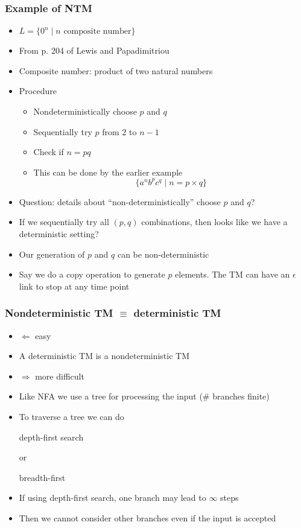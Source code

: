 \begin{frame}[allowframebreaks]
\begin{itemize}
\end{itemize}\end{frame} \begin{frame}[allowframebreaks] \frametitle{Example of NTM}
  \begin{itemize}
\item $L=\{0^n\mid n \mbox{ composite number}\}$
\item From p. 204 of Lewis and Papadimitriou
\item Composite number: product of two natural numbers
\item Procedure
  \begin{itemize}
  \item Nondeterministically choose $p$ and $q$

  \item [] Sequentially try $p$ from $2$ to $n-1$

  \item Check if $n=pq$

  \item [] This can be done by the earlier example
    \begin{equation*}
    \{a^n b^p c^q\mid n = p \times q\}
  \end{equation*}
  \end{itemize}
\item Question: details about ``non-deterministically'' choose $p$ and $q$?
\item If we sequentially try all $(p,q)$ combinations, then
  looks like we have a deterministic setting?
  
\item Our generation of  $p$ and $q$ can be non-deterministic
\item Say we do a copy operation to generate $p$ elements. The TM can
  have an $\epsilon$ link to stop at any time point
\end{itemize}\end{frame} \begin{frame}[allowframebreaks] \frametitle{Nondeterministic TM $
\equiv$ deterministic TM}
  \begin{itemize}
\item 
$\Leftarrow$ easy
\item
  [] A deterministic TM is a nondeterministic TM

\item
  $\Rightarrow$ more difficult
\item
  Like NFA we use a tree for processing the input
(\# branches finite)
\item
  To traverse a tree we can do
  \begin{center}
  depth-first search
\end{center}
  or
  \begin{center}
  breadth-first
\end{center}
\item If using depth-first search, one branch 
may lead to $\infty$ steps
\item [] Then we cannot consider other branches even if the
  input is accepted


\end{itemize}
\end{frame}
